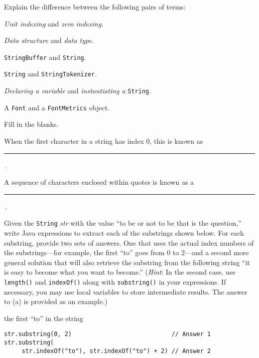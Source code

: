 \begin{EXRtwo}

\item  Explain the difference between the following pairs of terms:
\begin{EXRtwoLL}
\item  {\it Unit indexing} and {\it zero indexing}.
\item  {\it Data structure} and {\it data type}.
\item  {\tt StringBuffer} and {\tt String}.
\item  {\tt String} and {\tt StringTokenizer}.
\item  {\it Declaring a variable} and {\it instantiating a} {\tt String}.
\item  A {\tt Font} and a {\tt FontMetrics} object.
\end{EXRtwoLL}

\item  Fill in the blanks.

\begin{EXRtwoLL}\baselineskip=14pt
\item  When the first character in a string has index 0, this is known as \rule{40pt}{0.5pt}\,.
\item  A sequence of characters enclosed within quotes is known as a \rule{40pt}{0.5pt}\,.
\end{EXRtwoLL}\baselineskip=11pt

\item Given the {\tt String} {\it str} with the value ``to be or not
to be that is the question,'' write Java expressions to extract each
of the substrings shown below.  For each substring, provide two sets
of answers.  One that uses the actual index numbers of the
substrings---for example, the first ``to'' goes from 0 to 2---and a
second more general solution that will also retrieve the 
substring from the following string ``it is easy to become what you
want to become.''  ({\it Hint}: In the second case, use {\tt length()}
and {\tt indexOf()} along with {\tt substring()} in your expressions.
If necessary, you may use local variables to store intermediate
results.  The answer to (a) is provided as an example.)

\begin{EXRtwoLL}
\item  the first ``to'' in the string
\begin{jjjlisting}
\begin{lstlisting}
str.substring(0, 2)                            // Answer 1
str.substring(
     str.indexOf("to"), str.indexOf("to") + 2) // Answer 2
\end{lstlisting}
\end{jjjlisting}


\end{EXRtwoLL}
\end{EXRtwo}
